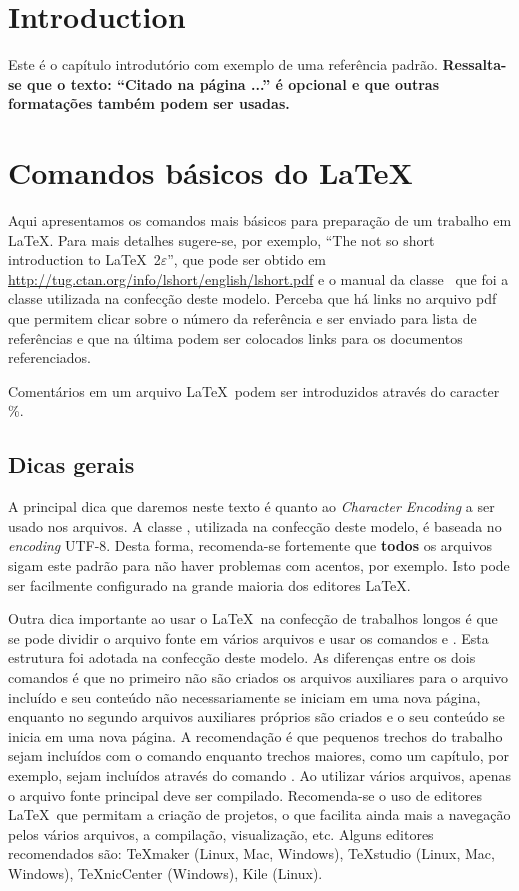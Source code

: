 \chapter{Introduction}

Este é o capítulo introdutório com exemplo de uma referência padrão. \textbf{Ressalta-se que o texto: ``Citado na página
...'' é opcional e que outras formatações também podem ser usadas.}
 

\chapter{Comandos básicos do \LaTeX \label{cap1}}


Aqui apresentamos os comandos mais básicos para preparação de um trabalho em \LaTeX. Para mais detalhes sugere-se, por exemplo, ``The
not so short introduction to  \LaTeX\  2$\varepsilon$'', que pode ser obtido em
\url{http://tug.ctan.org/info/lshort/english/lshort.pdf} e o manual da classe \abnTeX\ que foi a classe utilizada
na confecção deste modelo. Perceba que há links no arquivo pdf que permitem clicar sobre o número da referência e ser enviado para
lista de referências e que na última podem ser colocados links para os documentos referenciados.

Comentários em um arquivo \LaTeX\  podem ser introduzidos através do caracter \%. 

\section{Dicas gerais}

A principal dica que daremos neste texto é quanto ao \emph{Character Encoding} a ser usado nos arquivos. A classe \abnTeX, utilizada na
confecção deste modelo, é baseada no \emph{encoding} UTF-8. Desta forma, recomenda-se fortemente que \textbf{todos} os arquivos sigam
este padrão para não haver problemas com acentos, por exemplo. Isto pode ser facilmente configurado na grande maioria dos editores
\LaTeX.

Outra dica importante ao usar o  \LaTeX\ na confecção de trabalhos longos é que se pode dividir o arquivo fonte em vários arquivos e
usar os comandos \verb++ e \verb++. Esta estrutura foi adotada na confecção deste modelo. As diferenças
entre os dois comandos é que no primeiro não são criados os arquivos auxiliares para o arquivo incluído e seu conteúdo não
necessariamente se iniciam em uma nova página, enquanto no segundo arquivos auxiliares próprios são criados e o seu conteúdo se inicia
em uma nova página. A recomendação é que pequenos trechos do trabalho sejam incluídos com o comando \verb++ enquanto trechos
maiores, como um capítulo, por exemplo, sejam incluídos através do comando \verb++. Ao utilizar vários arquivos, apenas o
arquivo fonte principal deve ser compilado. Recomenda-se o uso de editores   \LaTeX\ que permitam a criação de projetos, o que facilita
ainda mais a navegação pelos vários arquivos, a compilação, visualização, etc.  Alguns editores recomendados são: TeXmaker (Linux, Mac,
Windows), TeXstudio (Linux, Mac, Windows), TeXnicCenter (Windows), Kile (Linux). 

